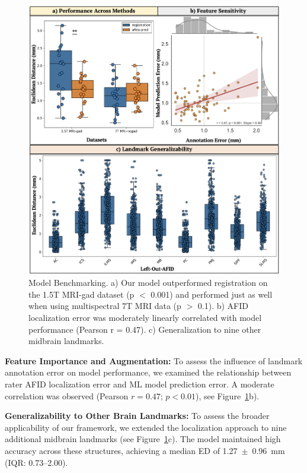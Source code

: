 \begin{figure}[hbt!]
    \centering
    \includegraphics[width=1\linewidth]{figs/ch4_Figure_bench2.png}
    \caption{Model Benchmarking. a) Our model outperformed registration on the 1.5T MRI-gad dataset (p \(<\) 0.001) and performed just as well when using multispectral 7T MRI data (p \(>\) 0.1). b) AFID localization error was moderately linearly correlated with model performance (Pearson r = 0.47). c) Generalization to nine other midbrain landmarks.}
    \label{fig:ch4_Figure_bench}
\end{figure}

\textbf{Feature Importance and Augmentation:} To assess the influence of landmark annotation error on model performance, we examined the relationship between rater AFID localization error and ML model prediction error. A moderate correlation was observed (Pearson $r = 0.47$; $p < 0.01$), see Figure~\ref{fig:ch4_Figure_bench}b).

\textbf{Generalizability to Other Brain Landmarks:} To assess the broader applicability of our framework, we extended the localization approach to nine additional midbrain landmarks (see Figure~\ref{fig:ch4_Figure_bench}c). The model maintained high accuracy across these structures, achieving a median ED of 1.27~$\pm$~0.96~mm (IQR: 0.73–2.00).

